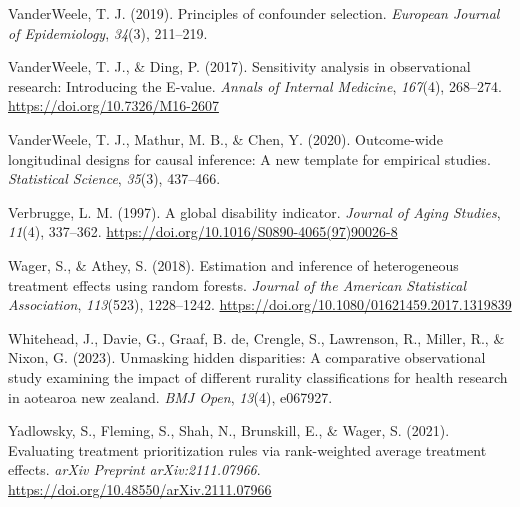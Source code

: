 \documentclass[
  single column]{article}
\newlength{\cslhangindent}
\newenvironment{CSLReferences}[2] %
 {\begin{list}{}{%
  \setlength{\itemindent}{0pt}
  \setlength{\leftmargin}{0pt}
  \setlength{\parsep}{0pt}
  \ifodd #1
   \setlength{\leftmargin}{\cslhangindent}
   \setlength{\itemindent}{-1\cslhangindent}
  \fi
  \setlength{\itemsep}{#2\baselineskip}}}
 {\end{list}}
\begin{document}
\begin{CSLReferences}{1}{0}
VanderWeele, T. J. (2019). Principles of confounder selection.
\emph{European Journal of Epidemiology}, \emph{34}(3), 211--219.

VanderWeele, T. J., \& Ding, P. (2017). Sensitivity analysis in
observational research: Introducing the {E}-value. \emph{Annals of
Internal Medicine}, \emph{167}(4), 268--274.
\url{https://doi.org/10.7326/M16-2607}

VanderWeele, T. J., Mathur, M. B., \& Chen, Y. (2020). Outcome-wide
longitudinal designs for causal inference: A new template for empirical
studies. \emph{Statistical Science}, \emph{35}(3), 437--466.

Verbrugge, L. M. (1997). A global disability indicator. \emph{Journal of
Aging Studies}, \emph{11}(4), 337--362.
\url{https://doi.org/10.1016/S0890-4065(97)90026-8}

Wager, S., \& Athey, S. (2018). Estimation and inference of
heterogeneous treatment effects using random forests. \emph{Journal of
the American Statistical Association}, \emph{113}(523), 1228--1242.
\url{https://doi.org/10.1080/01621459.2017.1319839}

Whitehead, J., Davie, G., Graaf, B. de, Crengle, S., Lawrenson, R.,
Miller, R., \& Nixon, G. (2023). Unmasking hidden disparities: A
comparative observational study examining the impact of different
rurality classifications for health research in aotearoa new zealand.
\emph{BMJ Open}, \emph{13}(4), e067927.

Yadlowsky, S., Fleming, S., Shah, N., Brunskill, E., \& Wager, S.
(2021). Evaluating treatment prioritization rules via rank-weighted
average treatment effects. \emph{arXiv Preprint arXiv:2111.07966}.
\url{https://doi.org/10.48550/arXiv.2111.07966}

\end{CSLReferences}
\end{document}
